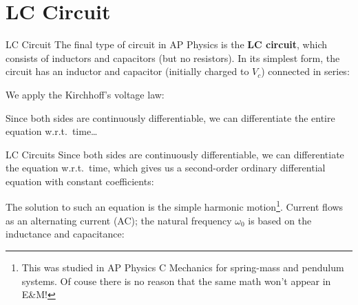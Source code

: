 \documentclass[12pt,aspectratio=169]{beamer}
\begin{document}
\section{LC Circuit}

\begin{frame}{LC Circuit}
  The final type of circuit in AP Physics is the \textbf{LC circuit}, which
  consists of inductors and capacitors (but no resistors). In its simplest
  form, the circuit has an inductor and capacitor (initially charged to $V_c$)
  connected in series:
  \begin{center}
  \end{center}
  We apply the Kirchhoff's voltage law:
  
  
  Since both sides are continuously differentiable, we can differentiate the
  entire equation w.r.t.\ time\ldots
\end{frame}



\begin{frame}{LC Circuits}
  Since both sides are continuously differentiable, we can differentiate the
  equation w.r.t.\ time, which gives us a second-order ordinary differential
  equation with constant coefficients:


  The solution to such an equation is the simple harmonic motion\footnote{This
  was studied in AP Physics C Mechanics for spring-mass and pendulum systems.
  Of couse there is no reason that the same math won't appear in E\&M!}.
  Current flows as an alternating current (AC); the natural frequency
  $\omega_0$ is based on the inductance and capacitance:

\end{frame}
\end{document}
